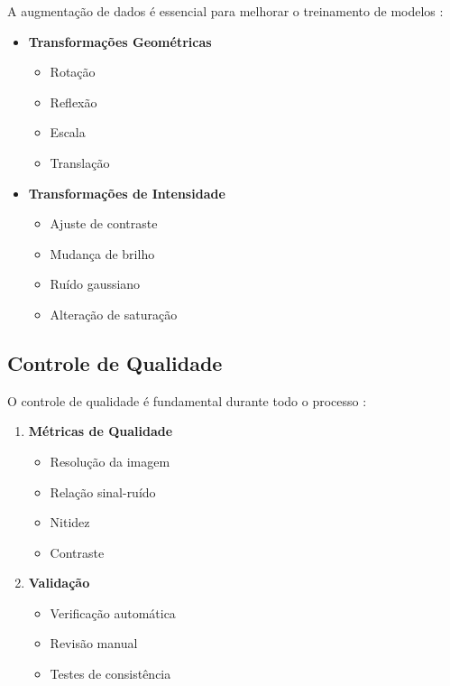 A augmentação de dados é essencial para melhorar o treinamento de modelos \cite{zhang2023augmentation}:

\begin{itemize}
\item \textbf{Transformações Geométricas}
\begin{itemize}
\item Rotação
\item Reflexão
\item Escala
\item Translação
\end{itemize}

\item \textbf{Transformações de Intensidade}
\begin{itemize}
    \item Ajuste de contraste
    \item Mudança de brilho
    \item Ruído gaussiano
    \item Alteração de saturação
\end{itemize}
\end{itemize}

\subsection{Controle de Qualidade}

O controle de qualidade é fundamental durante todo o processo \cite{chen2023quality}:

\begin{enumerate}
\item \textbf{Métricas de Qualidade}
\begin{itemize}
\item Resolução da imagem
\item Relação sinal-ruído
\item Nitidez
\item Contraste
\end{itemize}

\item \textbf{Validação}
\begin{itemize}
    \item Verificação automática
    \item Revisão manual
    \item Testes de consistência
\end{itemize}
\end{enumerate}